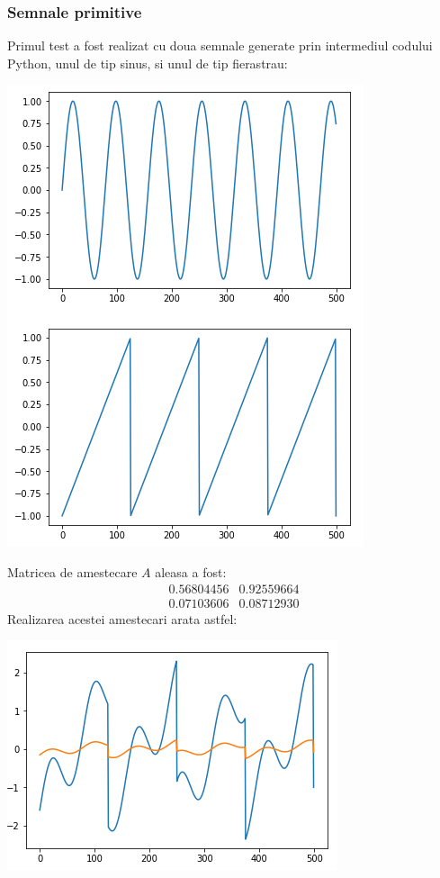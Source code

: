 \documentclass[12pt]{article}
\begin{document}
\subsubsection{Semnale primitive}
Primul test a fost realizat cu doua semnale generate prin intermediul codului Python, unul de tip sinus, si unul de tip fierastrau:
\begin{center}
	\includegraphics[scale=1]{primitive_waves}
\end{center}

Matricea de amestecare $A$ aleasa a fost:
\[
 \begin{matrix}
 	0.56804456  & 0.92559664 \\
	0.07103606  & 0.08712930 
 \end{matrix}
\]
Realizarea acestei amestecari arata astfel:
\begin{center}
	\includegraphics[scale=1]{primitives_mixed}
 \end{center}
\end{document}
